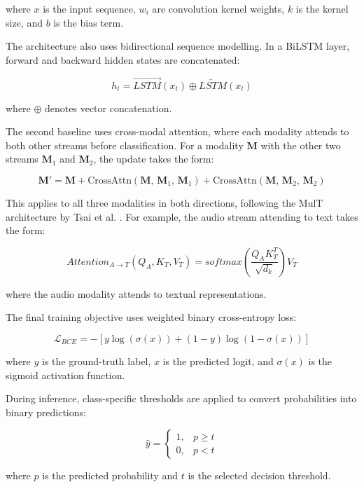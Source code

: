 where $x$ is the input sequence, $w_i$ are convolution kernel weights, $k$ is the kernel size, and $b$ is the bias term.

The architecture also uses bidirectional sequence modelling. In a BiLSTM layer, forward and backward hidden states are concatenated:

\begin{equation}
h_t =
\overrightarrow{LSTM}(x_t)
\oplus
\overleftarrow{LSTM}(x_t)
\end{equation}

where $\oplus$ denotes vector concatenation.

The second baseline uses cross-modal attention, where each modality attends to both other streams before classification. For a modality $\mathbf{M}$ with the other two streams $\mathbf{M}_1$ and $\mathbf{M}_2$, the update takes the form:

\begin{equation}
\mathbf{M}' = \mathbf{M}
+ \text{CrossAttn}(\mathbf{M},\, \mathbf{M}_1,\, \mathbf{M}_1)
+ \text{CrossAttn}(\mathbf{M},\, \mathbf{M}_2,\, \mathbf{M}_2)
\end{equation}

This applies to all three modalities in both directions, following the MulT architecture by Tsai et al. \cite{tsai2019multimodal}. For example, the audio stream attending to text takes the form:

\begin{equation}
Attention_{A \rightarrow T}(Q_A,K_T,V_T)
=
softmax
\left(
\frac{Q_AK_T^T}{\sqrt{d_k}}
\right)V_T
\end{equation}

where the audio modality attends to textual representations.

The final training objective uses weighted binary cross-entropy loss:

\begin{equation}
\mathcal{L}_{BCE} =
-
\left[
y\log(\sigma(x))
+
(1-y)\log(1-\sigma(x))
\right]
\end{equation}

where $y$ is the ground-truth label, $x$ is the predicted logit, and $\sigma(x)$ is the sigmoid activation function.

During inference, class-specific thresholds are applied to convert probabilities into binary predictions:

\begin{equation}
\hat y =
\begin{cases}
1, & p \ge t \\
0, & p < t
\end{cases}
\end{equation}

where $p$ is the predicted probability and $t$ is the selected decision threshold.